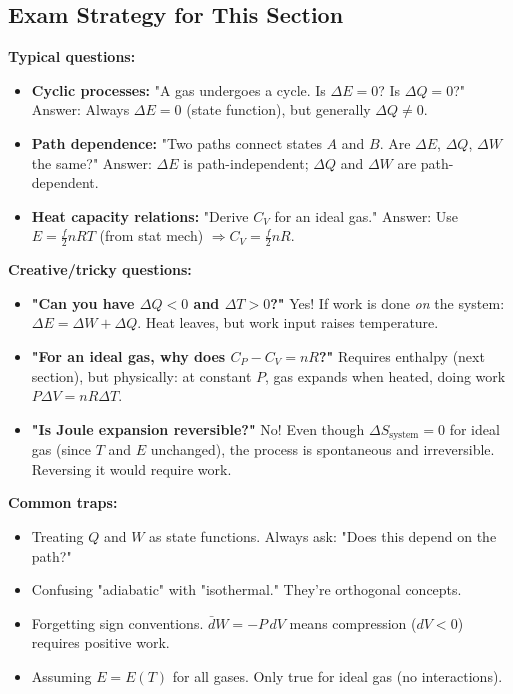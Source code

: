 \documentclass[9pt,twocoloumn]{article}
\begin{document}
\subsection{Exam Strategy for This Section}

\textbf{Typical questions:}
\begin{itemize}
    \item \textbf{Cyclic processes:} "A gas undergoes a cycle. Is $\Delta E = 0$? Is $\Delta Q = 0$?" Answer: Always $\Delta E = 0$ (state function), but generally $\Delta Q \neq 0$.
    \item \textbf{Path dependence:} "Two paths connect states $A$ and $B$. Are $\Delta E$, $\Delta Q$, $\Delta W$ the same?" Answer: $\Delta E$ is path-independent; $\Delta Q$ and $\Delta W$ are path-dependent.
    \item \textbf{Heat capacity relations:} "Derive $C_V$ for an ideal gas." Answer: Use $E = \frac{f}{2} nRT$ (from stat mech) $\Rightarrow C_V = \frac{f}{2} nR$.
\end{itemize}

\textbf{Creative/tricky questions:}
\begin{itemize}
    \item \textbf{"Can you have $\Delta Q < 0$ and $\Delta T > 0$?"} Yes! If work is done \emph{on} the system: $\Delta E = \Delta W + \Delta Q$. Heat leaves, but work input raises temperature.
    \item \textbf{"For an ideal gas, why does $C_P - C_V = nR$?"} Requires enthalpy (next section), but physically: at constant $P$, gas expands when heated, doing work $P \Delta V = nR \Delta T$.
    \item \textbf{"Is Joule expansion reversible?"} No! Even though $\Delta S_{\text{system}} = 0$ for ideal gas (since $T$ and $E$ unchanged), the process is spontaneous and irreversible. Reversing it would require work.
\end{itemize}

\textbf{Common traps:}
\begin{itemize}
    \item Treating $Q$ and $W$ as state functions. Always ask: "Does this depend on the path?"
    \item Confusing "adiabatic" with "isothermal." They're orthogonal concepts.
    \item Forgetting sign conventions. $\bar{d}W = -P \, dV$ means compression ($dV < 0$) requires positive work.
    \item Assuming $E = E(T)$ for all gases. Only true for ideal gas (no interactions).
\end{itemize}
\end{document}
